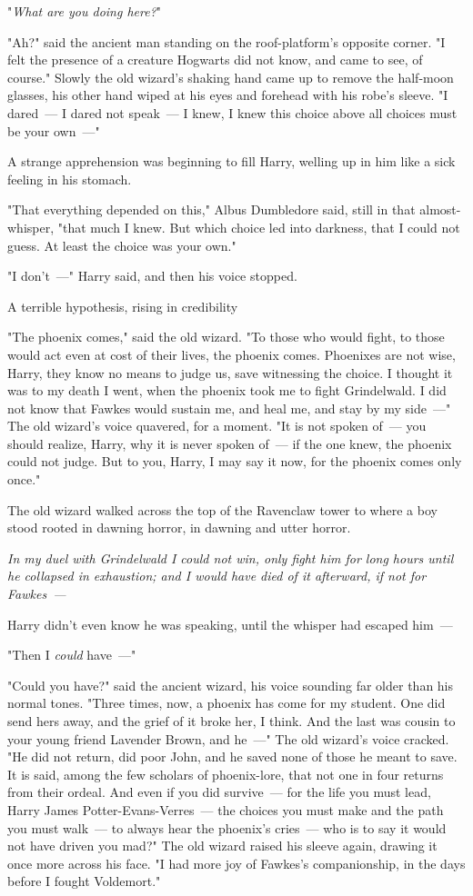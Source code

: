 "\emph{What are you doing here?}"

"Ah?" said the ancient man standing on the roof-platform's opposite corner. "I
felt the presence of a creature Hogwarts did not know, and came to see, of
course." Slowly the old wizard's shaking hand came up to remove the half-moon
glasses, his other hand wiped at his eyes and forehead with his robe's sleeve.
"I dared~--- I dared not speak~--- I knew, I knew this choice above all choices
must be your own~---"

A strange apprehension was beginning to fill Harry, welling up in him like a
sick feeling in his stomach.

"That everything depended on this," Albus Dumbledore said, still in that
almost-whisper, "that much I knew. But which choice led into darkness, that I
could not guess. At least the choice was your own."

"I don't~---" Harry said, and then his voice stopped.

A terrible hypothesis, rising in credibility{\el}

"The phoenix comes," said the old wizard. "To those who would fight, to those
would act even at cost of their lives, the phoenix comes. Phoenixes are not
wise, Harry, they know no means to judge us, save witnessing the choice. I
thought it was to my death I went, when the phoenix took me to fight
Grindelwald. I did not know that Fawkes would sustain me, and heal me, and stay
by my side~---" The old wizard's voice quavered, for a moment. "It is not spoken
of~--- you should realize, Harry, why it is never spoken of~--- if the one knew,
the phoenix could not judge. But to you, Harry, I may say it now, for the
phoenix comes only once."

The old wizard walked across the top of the Ravenclaw tower to where a boy
stood rooted in dawning horror, in dawning and utter horror.

\emph{In my duel with Grindelwald I could not win, only fight him for long
hours until he collapsed in exhaustion; and I would have died of it afterward,
if not for Fawkes~--- }

Harry didn't even know he was speaking, until the whisper had escaped him~---

"Then I \emph{could} have~---"

"Could you have?" said the ancient wizard, his voice sounding far older than
his normal tones. "Three times, now, a phoenix has come for my student. One did
send hers away, and the grief of it broke her, I think. And the last was cousin
to your young friend Lavender Brown, and he~---" The old wizard's voice cracked.
"He did not return, did poor John, and he saved none of those he meant to save.
It is said, among the few scholars of phoenix-lore, that not one in four
returns from their ordeal. And even if you did survive~--- for the life you must
lead, Harry James Potter-Evans-Verres~--- the choices you must make and the path
you must walk~--- to always hear the phoenix's cries~--- who is to say it would not
have driven you mad?" The old wizard raised his sleeve again, drawing it once
more across his face. "I had more joy of Fawkes's companionship, in the days
before I fought Voldemort."


